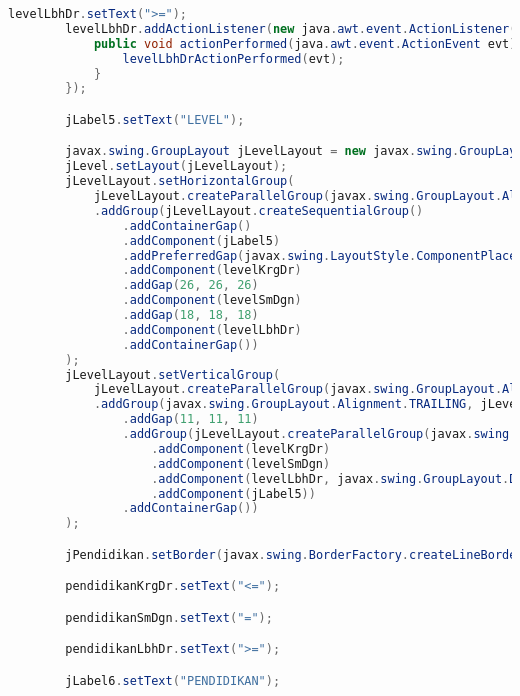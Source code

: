 \begin{lstlisting}[language=Java, caption=TampilanKondisiKetetanggaan.java]
        levelLbhDr.setText(">=");
        levelLbhDr.addActionListener(new java.awt.event.ActionListener() {
            public void actionPerformed(java.awt.event.ActionEvent evt) {
                levelLbhDrActionPerformed(evt);
            }
        });

        jLabel5.setText("LEVEL");

        javax.swing.GroupLayout jLevelLayout = new javax.swing.GroupLayout(jLevel);
        jLevel.setLayout(jLevelLayout);
        jLevelLayout.setHorizontalGroup(
            jLevelLayout.createParallelGroup(javax.swing.GroupLayout.Alignment.LEADING)
            .addGroup(jLevelLayout.createSequentialGroup()
                .addContainerGap()
                .addComponent(jLabel5)
                .addPreferredGap(javax.swing.LayoutStyle.ComponentPlacement.RELATED, javax.swing.GroupLayout.DEFAULT_SIZE, Short.MAX_VALUE)
                .addComponent(levelKrgDr)
                .addGap(26, 26, 26)
                .addComponent(levelSmDgn)
                .addGap(18, 18, 18)
                .addComponent(levelLbhDr)
                .addContainerGap())
        );
        jLevelLayout.setVerticalGroup(
            jLevelLayout.createParallelGroup(javax.swing.GroupLayout.Alignment.LEADING)
            .addGroup(javax.swing.GroupLayout.Alignment.TRAILING, jLevelLayout.createSequentialGroup()
                .addGap(11, 11, 11)
                .addGroup(jLevelLayout.createParallelGroup(javax.swing.GroupLayout.Alignment.BASELINE)
                    .addComponent(levelKrgDr)
                    .addComponent(levelSmDgn)
                    .addComponent(levelLbhDr, javax.swing.GroupLayout.DEFAULT_SIZE, javax.swing.GroupLayout.DEFAULT_SIZE, Short.MAX_VALUE)
                    .addComponent(jLabel5))
                .addContainerGap())
        );

        jPendidikan.setBorder(javax.swing.BorderFactory.createLineBorder(new java.awt.Color(0, 0, 0)));

        pendidikanKrgDr.setText("<=");

        pendidikanSmDgn.setText("=");

        pendidikanLbhDr.setText(">=");

        jLabel6.setText("PENDIDIKAN");


\end{lstlisting}
